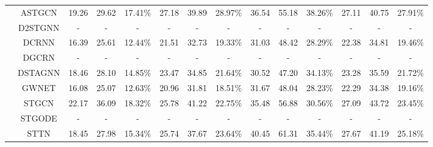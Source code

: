 \begin{table}[t]
{\begin{tabular}{c|c|c|c|c|c|c|c|c|c|c|c|c|c}
 & ASTGCN & 19.26 & 29.62 & 17.41\% & 27.18 & 39.89 & 28.97\% & 36.54 & 55.18 & 38.26\% & 27.11 & 40.75 & 27.91\% \\
 & D2STGNN & - & - & - & - & - & - & - & - & - & - & - & - \\
 & DCRNN & 16.39 & 25.61 & 12.44\% & 21.51 & 32.73 & 19.33\% & 31.03 & 48.42 & 28.29\% & 22.38 & 34.81 & 19.46\% \\
 & DGCRN & - & - & - & - & - & - & - & - & - & - & - & - \\
 & DSTAGNN & 18.46 & 28.10 & 14.85\% & 23.47 & 34.85 & 21.64\% & 30.52 & 47.20 & 34.13\% & 23.28 & 35.59 & 21.72\% \\
 & GWNET & 16.08 & 25.07 & 12.63\% & 20.96 & 31.81 & 18.51\% & 31.67 & 48.04 & 28.23\% & 22.29 & 34.38 & 19.16\% \\
 & STGCN & 22.17 & 36.09 & 18.32\% & 25.78 & 41.22 & 22.75\% & 35.48 & 56.88 & 30.56\% & 27.09 & 43.72 & 23.45\% \\
 & STGODE & - & - & - & - & - & - & - & - & - & - & - & - \\
 & STTN & 18.45 & 27.98 & 15.34\% & 25.74 & 37.67 & 23.64\% & 40.45 & 61.31 & 35.44\% & 27.67 & 41.19 & 25.18\% \\
\bottomrule
\end{tabular}
}
\end{table}
